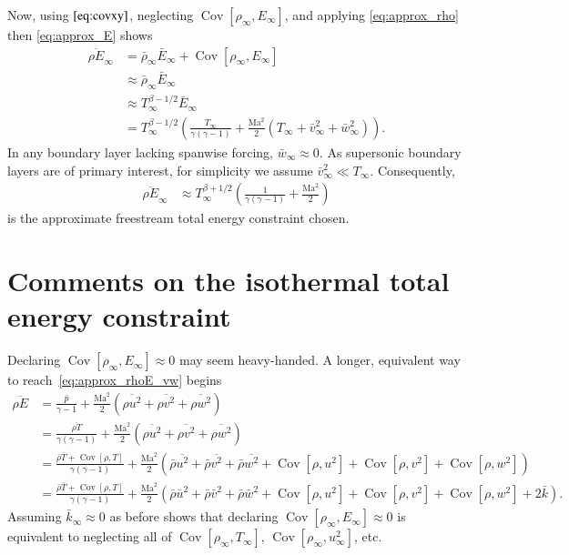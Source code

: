\documentclass[letterpaper,11pt,nointlimits,reqno]{amsart}
\newcommand{\Mach}[1][]{\mbox{Ma}_{#1}}
\newcommand{\Cov}[2]{\ensuremath{\operatorname{Cov}\left[{#1},{#2}\right]}}
\begin{document}
Now, using $\eqref{eq:covxy}$, neglecting $\Cov{\rho_\infty}{E_\infty}$, and
applying \eqref{eq:approx_rho} then \eqref{eq:approx_E} shows
\begin{align}
  \overline{\rho E}_\infty
  &=
  \bar{\rho}_\infty \bar{E}_\infty + \Cov{\rho_\infty}{E_\infty}
\\
  &\approx \bar{\rho}_\infty \bar{E}_\infty
\\
  &\approx T_\infty^{\beta-1/2} \bar{E}_\infty
\\
  \label{eq:approx_rhoE_vw}
  &=
  T_\infty^{\beta-1/2} \left(
      \frac{T_\infty}{\gamma\left( \gamma-1 \right)}
    + \frac{\Mach^2}{2}\left(T_\infty+\bar{v}^2_\infty+\bar{w}^2_\infty\right)
  \right)
.
\end{align}
In any boundary layer lacking spanwise forcing, $\bar{w}_\infty\approx{}0$.  As
supersonic boundary layers are of primary interest, for simplicity we assume
$\bar{v}_\infty^2 \ll T_\infty$.  Consequently,
\begin{align}
  \label{eq:approx_rhoE}
  \overline{\rho E}_\infty
  &\approx
  T_\infty^{\beta+1/2} \left(
      \frac{1}{\gamma\left(\gamma-1\right)}
    + \frac{\Mach^2}{2}
  \right)
\end{align}
is the approximate freestream total energy constraint chosen.

\section{Comments on the isothermal total energy constraint}

Declaring $\Cov{\rho_\infty}{E_\infty} \approx 0$ may seem heavy-handed.  A
longer, equivalent way to reach~\eqref{eq:approx_rhoE_vw} begins
\begin{align}
  \overline{\rho E}
&=
    \frac{\bar{p}}{\gamma-1}
  + \frac{\Mach^2}{2}\left(
        \overline{\rho u^2}
      + \overline{\rho v^2}
      + \overline{\rho w^2}
    \right)
\\
&=
    \frac{\overline{\rho T}}{\gamma\left(\gamma-1\right)}
  + \frac{\Mach^2}{2}\left(
        \overline{\rho u^2}
      + \overline{\rho v^2}
      + \overline{\rho w^2}
    \right)
\\
&=
    \frac{\bar{\rho}\bar{T} + \Cov{\rho}{T}}
         {\gamma\left(\gamma-1\right)}
  + \frac{\Mach^2}{2}\left(
        \bar{\rho} \overline{u^2}
      + \bar{\rho} \overline{v^2}
      + \bar{\rho} \overline{w^2}
      + \Cov{\rho}{u^2}
      + \Cov{\rho}{v^2}
      + \Cov{\rho}{w^2}
    \right)
\\
&=
    \frac{\bar{\rho}\bar{T} + \Cov{\rho}{T}}
         {\gamma\left(\gamma-1\right)}
  + \frac{\Mach^2}{2}\left(
        \bar{\rho} \bar{u}^2
      + \bar{\rho} \bar{v}^2
      + \bar{\rho} \bar{w}^2
      + \Cov{\rho}{u^2}
      + \Cov{\rho}{v^2}
      + \Cov{\rho}{w^2}
      + 2 \bar{k}
    \right)
.
\end{align}
Assuming $\bar{k}_\infty \approx 0$ as before shows that declaring
$\Cov{\rho_\infty}{E_\infty} \approx 0$ is equivalent to neglecting all of
$\Cov{\rho_\infty}{T_\infty}$, $\Cov{\rho_\infty}{u^2_\infty}$, etc.
\end{document}

